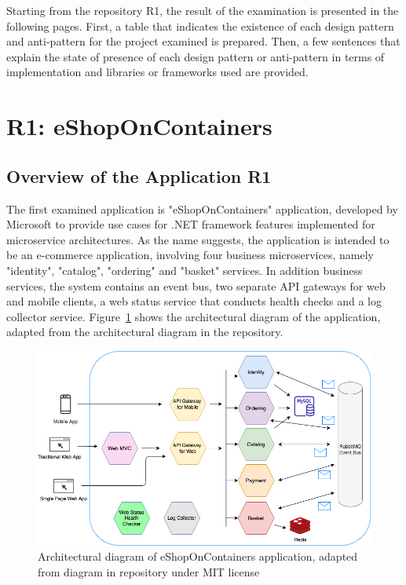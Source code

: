 \documentclass{Configuration_Files/PoliMi3i_thesis}
\begin{document}
Starting from the repository R1, the result of the examination is presented in the following pages.
First, a table that indicates the existence of each design pattern and anti-pattern for the project examined is prepared.
Then, a few sentences that explain the state of presence of each design pattern or anti-pattern in terms of implementation and libraries or frameworks used are provided. 

\section{R1: eShopOnContainers}
\label{sec:R1}

\subsection{Overview of the Application R1}
\label{subsec:R1_overview}

The first examined application is "eShopOnContainers" application, developed by Microsoft to provide use cases for .NET framework features implemented for microservice architectures.
As the name suggests, the application is intended to be an e-commerce application, involving four business microservices, namely "identity", "catalog", "ordering" and "basket" services.
In addition business services, the system contains an event bus, two separate API gateways for web and mobile clients, a web status service that conducts health checks and a log collector service.
Figure~\ref{fig:R1_arch} shows the architectural diagram of the application, adapted from the architectural diagram in the repository.

\begin{figure}[H]
\centering
\includegraphics[width=1\textwidth]{myImages/R1.png}
\caption{Architectural diagram of eShopOnContainers application, adapted from diagram in repository under MIT license}
\label{fig:R1_arch}
\end{figure}
\end{document}
